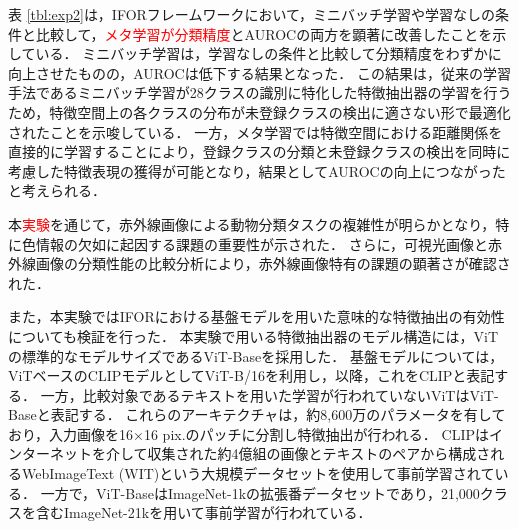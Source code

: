 \documentclass[a4paper,11pt,nomag]{jsreport}
\begin{document}
表 \ref{tbl:exp2}は，IFORフレームワークにおいて，ミニバッチ学習や学習なしの条件と比較して，\textcolor{red}{メタ学習が分類精度}とAUROCの両方を顕著に改善したことを示している．
ミニバッチ学習は，学習なしの条件と比較して分類精度をわずかに向上させたものの，AUROCは低下する結果となった．
この結果は，従来の学習手法であるミニバッチ学習が28クラスの識別に特化した特徴抽出器の学習を行うため，特徴空間上の各クラスの分布が未登録クラスの検出に適さない形で最適化されたことを示唆している．
一方，メタ学習では特徴空間における距離関係を直接的に学習することにより，登録クラスの分類と未登録クラスの検出を同時に考慮した特徴表現の獲得が可能となり，結果としてAUROCの向上につながったと考えられる．

本\textcolor{red}{実験}を通じて，赤外線画像による動物分類タスクの複雑性が明らかとなり，特に色情報の欠如に起因する課題の重要性が示された．
さらに，可視光画像と赤外線画像の分類性能の比較分析により，赤外線画像特有の課題の顕著さが確認された．

また，本{実験}ではIFORにおける基盤モデルを用いた意味的な特徴抽出の有効性についても検証を行った．
本実験で用いる特徴抽出器のモデル構造には，ViTの標準的なモデルサイズであるViT-Baseを採用した．
基盤モデルについては，ViTベースのCLIPモデルとしてViT-B/16を利用し，以降，これをCLIPと表記する．
一方，比較対象であるテキストを用いた学習が行われていないViTはViT-Baseと表記する．
これらのアーキテクチャは，約8,600万のパラメータを有しており，入力画像を16$\times$16 pix.のパッチに分割し特徴抽出が行われる．
CLIPはインターネットを介して収集された約4億組の画像とテキストのペアから構成されるWebImageText (WIT)という大規模データセットを使用して事前学習されている．
一方で，ViT-BaseはImageNet-1kの拡張番データセットであり，21,000クラスを含むImageNet-21kを用いて事前学習が行われている．
\end{document}
